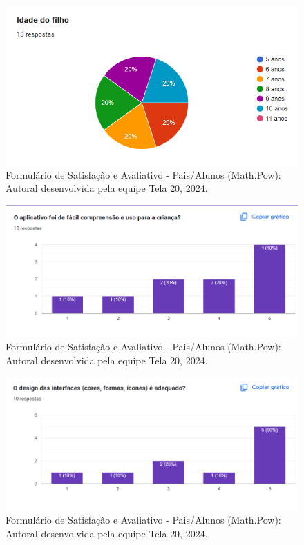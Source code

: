 \documentclass[12pt, openany, oneside, a4paper, english, brazil]{abntex2}   %
\begin{document}
\begin{figure}
    \centering
    \includegraphics{figuras/Formulário Gráficos/Pais/6 idade dos filhos.png}
    \caption{Formulário de Satisfação e Avaliativo  - Pais/Alunos (Math.Pow):  Autoral desenvolvida pela equipe Tela 20, 2024.}
    \label{gráfico gerado pelo formulário}
\end{figure}

\begin{figure}
    \centering
    \includegraphics[width=0.8\linewidth]{figuras/Formulário Gráficos/Pais/7 O aplicativo foi de facil compreensao e uso para a crianca.png}
    \caption{Formulário de Satisfação e Avaliativo  - Pais/Alunos (Math.Pow):  Autoral desenvolvida pela equipe Tela 20, 2024.}
    \label{gráfico gerado pelo formulário}
\end{figure}

\begin{figure}
    \centering
    \includegraphics[width=0.8\linewidth]{figuras/Formulário Gráficos/Pais/8 O design das interfaces e adequado.png}
    \caption{Formulário de Satisfação e Avaliativo  - Pais/Alunos (Math.Pow):  Autoral desenvolvida pela equipe Tela 20, 2024.}
    \label{gráfico gerado pelo formulário}
\end{figure}
\end{document}
